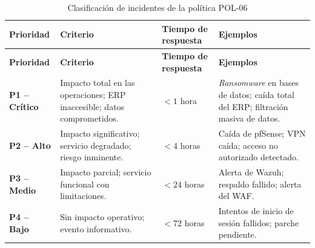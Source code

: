 \documentclass[11pt, a4paper, oneside]{report}
\begin{document}
\begin{xltabular}{\textwidth}{@{}|L{2.2cm}|X|L{1.8cm}|L{3.6cm}|@{}}
\caption{Clasificación de incidentes de la política POL-06}
\label{tab:pol06_clasificacion_incidentes} \\

\parbox[c][1.1cm][c]{\linewidth}{\centering\color{white}\bfseries\small Prioridad} &
\parbox[c][1.1cm][c]{\linewidth}{\centering\color{white}\bfseries\small Criterio} &
\parbox[c][1.1cm][c]{\linewidth}{\centering\color{white}\bfseries\small Tiempo de respuesta} &
\parbox[c][1.1cm][c]{\linewidth}{\centering\color{white}\bfseries\small Ejemplos} \\ \hline
\endfirsthead

\parbox[c][1.1cm][c]{\linewidth}{\centering\color{white}\bfseries\small Prioridad} &
\parbox[c][1.1cm][c]{\linewidth}{\centering\color{white}\bfseries\small Criterio} &
\parbox[c][1.1cm][c]{\linewidth}{\centering\color{white}\bfseries\small Tiempo de respuesta} &
\parbox[c][1.1cm][c]{\linewidth}{\centering\color{white}\bfseries\small Ejemplos} \\ \hline
\endhead

\hline
\endfoot

{\small \textcolor{sev_critico}{\textbf{P1 -- Crítico}}} & {\small Impacto total en las operaciones; ERP inaccesible; datos comprometidos.} & {\small \(< 1\) hora} & {\small \textit{Ransomware} en bases de datos; caída total del ERP; filtración masiva de datos.} \\ \hline
{\small \textcolor{sev_alto}{\textbf{P2 -- Alto}}} & {\small Impacto significativo; servicio degradado; riesgo inminente.} & {\small \(< 4\) horas} & {\small Caída de pfSense; VPN caída; acceso no autorizado detectado.} \\ \hline
{\small \textcolor{sev_medio}{\textbf{P3 -- Medio}}} & {\small Impacto parcial; servicio funcional con limitaciones.} & {\small \(< 24\) horas} & {\small Alerta de Wazuh; respaldo fallido; alerta del WAF.} \\ \hline
{\small \textcolor{sev_bajo}{\textbf{P4 -- Bajo}}} & {\small Sin impacto operativo; evento informativo.} & {\small \(< 72\) horas} & {\small Intentos de inicio de sesión fallidos; parche pendiente.} \\ \hline

\end{xltabular}

\normalsize
\end{document}

